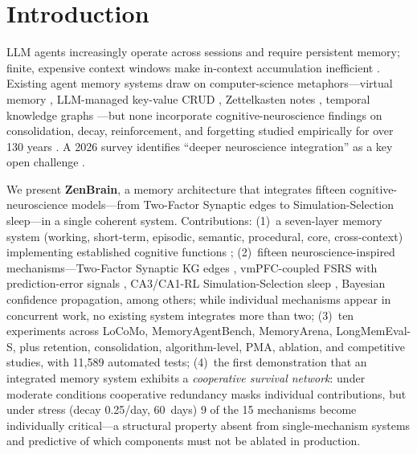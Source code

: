 \documentclass{article}
\begin{document}
\section{Introduction}
\label{sec:intro}

LLM agents increasingly operate across sessions and require persistent
memory; finite, expensive context windows make in-context accumulation
inefficient \citep{maharana2024locomo, he2026memoryarena}. Existing
agent memory systems draw on computer-science metaphors---virtual
memory \citep{packer2023memgpt}, LLM-managed key-value CRUD
\citep{chhikara2025mem0}, Zettelkasten notes \citep{xu2025amem},
temporal knowledge graphs \citep{rasmussen2025zep}---but none
incorporate cognitive-neuroscience findings on consolidation, decay,
reinforcement, and forgetting studied empirically for over 130 years
\citep{ebbinghaus1885, hebb1949, tulving1972, stickgold2013}.
A 2026 survey identifies ``deeper neuroscience integration'' as a key
open challenge \citep{du2026memory}.

We present \textbf{ZenBrain}, a memory architecture that integrates
fifteen cognitive-neuroscience models---from Two-Factor Synaptic edges
to Simulation-Selection sleep---in a single coherent system.
Contributions:
(1)~a seven-layer memory system (working, short-term, episodic, semantic,
procedural, core, cross-context) implementing established cognitive
functions \citep{atkinson1968, tulving1972, cohen1980};
(2)~fifteen neuroscience-inspired mechanisms---Two-Factor Synaptic KG edges
\citep{zenke2025,zenke2017}, vmPFC-coupled FSRS with prediction-error
signals \citep{zou2025}, CA3/CA1-RL Simulation-Selection sleep
\citep{chen2025,marche2025}, Bayesian confidence propagation, among
others; while individual mechanisms appear in concurrent work, no
existing system integrates more than two;
(3)~ten experiments across LoCoMo, MemoryAgentBench, MemoryArena,
LongMemEval-S, plus retention, consolidation, algorithm-level, PMA,
ablation, and competitive studies, with 11{,}589 automated tests;
(4)~the first demonstration that an integrated memory system
exhibits a \emph{cooperative survival network}: under moderate
conditions cooperative redundancy masks individual contributions,
but under stress (decay 0.25/day, 60~days) 9 of the 15 mechanisms
become individually critical---a structural property absent from
single-mechanism systems and predictive of which components must
not be ablated in production.
\end{document}
